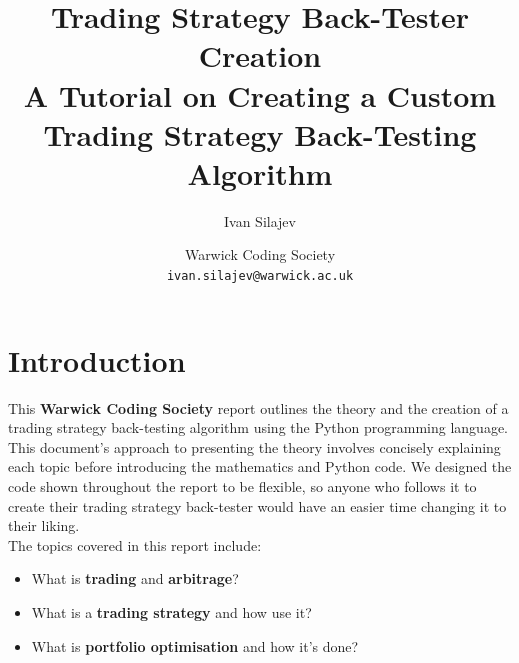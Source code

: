 \documentclass[11pt]{article}
\begin{document}
\begin{titlepage}
    
    \title{Trading Strategy Back-Tester Creation\\
    \large A Tutorial on Creating a Custom\\ Trading Strategy Back-Testing Algorithm}
    
    
    \author{Ivan Silajev}
    
    \date{
    Warwick Coding Society \\
    \texttt{ivan.silajev@warwick.ac.uk}
    }
    
    \maketitle
    
    \tableofcontents
    
\end{titlepage}

\section{Introduction}

This \textbf{Warwick Coding Society} report outlines the theory and the creation of a trading strategy back-testing algorithm using the Python programming language.
This document's approach to presenting the theory involves concisely explaining each topic before introducing the mathematics and Python code.
We designed the code shown throughout the report to be flexible, so anyone who follows it to create their trading strategy back-tester would have an easier time changing it to their liking.\\

The topics covered in this report include:
\begin{itemize}
    \item What is \textbf{trading} and \textbf{arbitrage}?
    \item What is a \textbf{trading strategy} and how use it?
    \item What is \textbf{portfolio optimisation} and how it's done?
\end{itemize}
\end{document}
